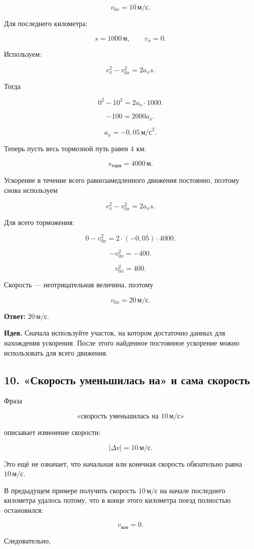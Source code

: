 \documentclass[a4paper,12pt]{article}
\newcommand{\ms}{\,\text{м/с}}
\newcommand{\mss}{\,\text{м/с}^2}
\newcommand{\important}[1]{\textcolor{darkaccent}{\textbf{#1}}}
\begin{document}
\[
v_{0x}=10\ms.
\]

Для последнего километра:

\[
s=1000\,\text{м},
\qquad
v_x=0.
\]

Используем:

\[
v_x^2-v_{0x}^2=2a_xs.
\]

Тогда

\[
0^2-10^2
=
2a_x\cdot1000.
\]

\[
-100=2000a_x.
\]

\[
a_x=-0{,}05\mss.
\]

Теперь пусть весь тормозной путь равен $4$ км:

\[
s_{\text{торм}}=4000\,\text{м}.
\]

Ускорение в течение всего равнозамедленного движения постоянно,
поэтому снова используем

\[
v_x^2-v_{0x}^2=2a_xs.
\]

Для всего торможения:

\[
0-v_{0x}^2
=
2\cdot(-0{,}05)\cdot4000.
\]

\[
-v_{0x}^2=-400.
\]

\[
v_{0x}^2=400.
\]

Скорость --- неотрицательная величина, поэтому

\[
v_{0x}=20\ms.
\]

\textbf{Ответ:}
$20\ms$.

\important{Идея.}
Сначала используйте участок,
на котором достаточно данных для нахождения ускорения.
После этого найденное постоянное ускорение можно использовать
для всего движения.

\subsection*{10. «Скорость уменьшилась на» и сама скорость}

Фраза

\[
\text{«скорость уменьшилась на }10\ms\text{»}
\]

описывает изменение скорости:

\[
|\Delta v|=10\ms.
\]

Это ещё не означает,
что начальная или конечная скорость обязательно равна $10\ms$.

В предыдущем примере получить скорость $10\ms$
на начале последнего километра удалось потому,
что в конце этого километра поезд полностью остановился:

\[
v_{\text{кон}}=0.
\]

Следовательно,
\end{document}
